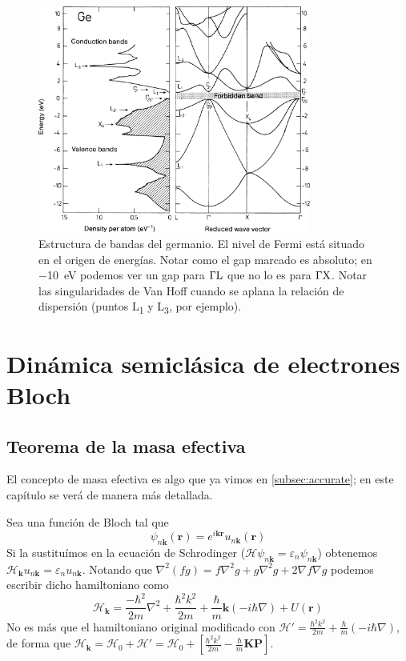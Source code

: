 \begin{figure}
  \centering
  \includegraphics[width=0.8\textwidth]{figures/geexample.png}
  \caption{Estructura de bandas del germanio. El nivel de Fermi está
    situado en el origen de energías. Notar como el gap marcado es
    absoluto; en \SI{-10}{\eV} podemos ver un gap para $\Gamma \text
    L$ que no lo es para $\Gamma \text X$. Notar las singularidades
    de Van Hoff cuando se aplana la relación de dispersión (puntos
    L\textsubscript 1 y L\textsubscript 3, por ejemplo).}
  \label{fig:geexample}
\end{figure}

\chapter{Dinámica semiclásica de electrones Bloch}
\section{Teorema de la masa efectiva}
El concepto de masa efectiva es algo que ya vimos en
\ref{subsec:accurate}; en este capítulo se verá de manera más detallada.

Sea una función de Bloch tal que
\begin{equation}
  \psi_{n \mathbf{k}} (\mathbf{r}) = e^{i \mathbf{k}\mathbf{r}} u_{n
    \mathbf{k}} (\mathbf{r})
\end{equation}
Si la sustituímos en la ecuación de Schrodinger ($\mathcal{H} \psi_{n
  \mathbf{k}} = \varepsilon_n \psi_{n \mathbf{k}}$) obtenemos $\mathcal{H}_\mathbf{k} u_{n
  \mathbf{k}} = \varepsilon_n u_{n \mathbf{k}}$. Notando que $\nabla^2
(fg) = f \nabla^2 g + g \nabla^2 g + 2 \nabla f \nabla g$ podemos
escribir dicho hamiltoniano como 
\begin{equation}
  \mathcal{H}_\mathbf{k} = \frac{-\hbar^2}{2m}\nabla^2 + \frac{\hbar^2
  k^2}{2m} + \frac{\hbar}{m}\mathbf{k}(-i \hbar \nabla) + U(\mathbf{r})
\end{equation}
No es más que el hamiltoniano original modificado con $\mathcal{H}' =
\frac{\hbar^2 k^2}{2m} + \frac{\hbar}{m}(-i \hbar \nabla)$, de forma
que $\mathcal{H}_\mathbf{k} = \mathcal{H}_0 + \mathcal{H}' =
\mathcal{H}_0 + \left[ \frac{\hbar^2 k^2}{2m} - \frac{\hbar}{m} \mathbf{K}\mathbf{P} \right]$.

